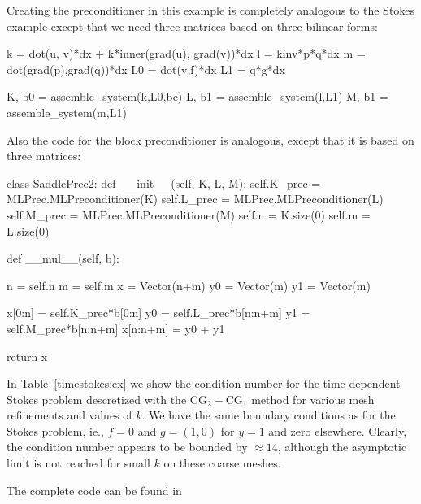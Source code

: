 Creating the preconditioner in this example is completely analogous to the Stokes
example except that we need three matrices based on three bilinear forms: 
\begin{python}
k = dot(u, v)*dx +  k*inner(grad(u), grad(v))*dx 
l = kinv*p*q*dx 
m = dot(grad(p),grad(q))*dx 
L0 = dot(v,f)*dx 
L1 = q*g*dx 

K, b0 = assemble_system(k,L0,bc)
L, b1 = assemble_system(l,L1)
M, b1 = assemble_system(m,L1)
\end{python}
Also the code for the block preconditioner is analogous, except that
it is based on three matrices: 
\begin{python}
class SaddlePrec2: 
    def __init__(self, K, L, M):  
        self.K_prec = MLPrec.MLPreconditioner(K)
        self.L_prec = MLPrec.MLPreconditioner(L)
        self.M_prec = MLPrec.MLPreconditioner(M)
        self.n = K.size(0)
        self.m = L.size(0)

    def __mul__(self, b):

        n = self.n
        m = self.m
        x = Vector(n+m)
        y0 = Vector(m)
        y1 = Vector(m)

        x[0:n]    = self.K_prec*b[0:n]
        y0        = self.L_prec*b[n:n+m] 
        y1        = self.M_prec*b[n:n+m] 
        x[n:n+m]   = y0 + y1  

        return x 
\end{python}
In Table~\ref{timestokes:ex} we show the condition number for the time-dependent Stokes problem descretized
with the $\mathrm{CG}_2-\mathrm{CG}_1$ method for various mesh refinements and values of $k$. We have the 
same boundary conditions as for the Stokes problem, ie., $f=0$ and $g = (1,0)$ for $y=1$ and zero elsewhere. 
Clearly, the condition number appears to be bounded by $\approx 14$,  although the asymptotic limit 
is not reached for small $k$ on these coarse meshes. 


The complete code can be found in 

